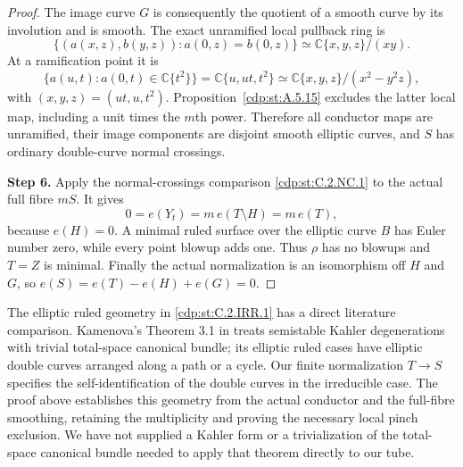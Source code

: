 \begin{proof}
The image curve $G$ is consequently the quotient of a
smooth curve by its involution and is smooth.  The exact
unramified local pullback ring is
\[
 \{(a(x,z),b(y,z)):a(0,z)=b(0,z)\}
       \simeq\mathbb C\{x,y,z\}/(xy).
\]
At a ramification point it is
\[
 \{a(u,t):a(0,t)\in\mathbb C\{t^2\}\}
 =\mathbb C\{u,ut,t^2\}
 \simeq\mathbb C\{x,y,z\}/(x^2-y^2z),
 \tag{C.IR.6}\label{cdp:eq:C.IR.6}
\]
with $(x,y,z)=(ut,u,t^2)$.  Proposition~\ref{cdp:st:A.5.15}
excludes the latter local map, including a unit times the
$m$th power.  Therefore all conductor maps are unramified,
their image components are disjoint smooth elliptic curves,
and $S$ has ordinary double-curve normal crossings.

\noindent\textbf{Step 6.} Apply the normal-crossings
comparison \ref{cdp:st:C.2.NC.1} to the actual full fibre
$mS$.  It gives
\[
 0=e(Y_t)=m\,e(T\setminus H)=m\,e(T),
 \tag{C.IR.9}\label{cdp:eq:C.IR.9}
\]
because $e(H)=0$.  A minimal ruled surface over the elliptic
curve $B$ has Euler number zero, while every point blowup
adds one.  Thus $\rho$ has no blowups and $T=Z$ is minimal.
Finally the actual normalization is an isomorphism off
$H$ and $G$, so $e(S)=e(T)-e(H)+e(G)=0$.
\end{proof}




The elliptic ruled geometry in \ref{cdp:st:C.2.IRR.1} has a direct literature
comparison. Kamenova's Theorem 3.1 in \cite{KamenovaTori} treats
semistable Kahler degenerations with trivial total-space canonical
bundle; its elliptic ruled cases have elliptic double curves arranged
along a path or a cycle. Our finite normalization $T\to S$ specifies
the self-identification of the double curves in the irreducible case.
The proof above establishes this geometry from the actual conductor
and the full-fibre smoothing, retaining the multiplicity and proving
the necessary local pinch exclusion. We have not supplied a Kahler
form or a trivialization of the total-space canonical bundle needed
to apply that theorem directly to our tube. 




